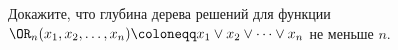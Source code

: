 Докажите, что глубина дерева решений для функции $\OR_n(x_1, x_2, \dots, x_n) \coloneqq x_1 \lor x_2 \lor
\dots \lor x_n$ не меньше $n$.
